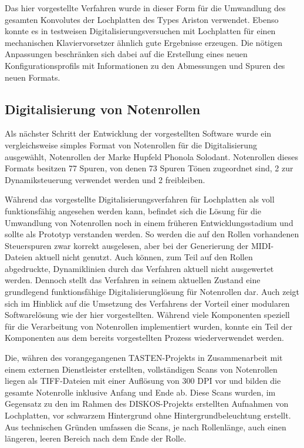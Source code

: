 Das hier vorgestellte Verfahren wurde in dieser Form für die Umwandlung des gesamten Konvolutes der Lochplatten des Types Ariston verwendet.
Ebenso konnte es in testweisen Digitalisierungsversuchen mit Lochplatten für einen mechanischen Klaviervorsetzer ähnlich gute Ergebnisse erzeugen.
Die nötigen Anpassungen beschränken sich dabei auf die Erstellung eines neuen Konfigurationsprofils mit Informationen zu den Abmessungen und Spuren des neuen Formats.

\subsection{Digitalisierung von Notenrollen}

Als nächster Schritt der Entwicklung der vorgestellten Software wurde ein vergleichsweise simples Format von Notenrollen für die Digitalisierung ausgewählt, Notenrollen der Marke Hupfeld Phonola Solodant.
Notenrollen dieses Formats besitzen 77 Spuren, von denen 73 Spuren Tönen zugeordnet sind, 2 zur Dynamiksteuerung verwendet werden und 2 freibleiben.

Während das vorgestellte Digitalisierungsverfahren für Lochplatten als voll funktionsfähig angesehen werden kann, befindet sich die Lösung für die Umwandlung von Notenrollen noch in einem früheren Entwicklungsstadium und sollte als Prototyp verstanden werden.
So werden die auf den Rollen vorhandenen Steuerspuren zwar korrekt ausgelesen, aber bei der Generierung der MIDI-Dateien aktuell nicht genutzt.
Auch können, zum Teil auf den Rollen abgedruckte, Dynamiklinien durch das Verfahren aktuell nicht ausgewertet werden.
Dennoch stellt das Verfahren in seinem aktuellen Zustand eine grundlegend funktionsfähige Digitalisierunglösung für Notenrollen dar.
Auch zeigt sich im Hinblick auf die Umsetzung des Verfahrens der Vorteil einer modularen Softwarelösung wie der hier vorgestellten.
Während viele Komponenten speziell für die Verarbeitung von Notenrollen implementiert wurden, konnte ein Teil der Komponenten aus dem bereits vorgestellten Prozess wiederverwendet werden.

Die, währen des vorangegangenen TASTEN-Projekts in Zusammenarbeit mit einem externen Dienstleister erstellten, vollständigen Scans von Notenrollen liegen als TIFF-Dateien mit einer Auflösung von 300 DPI vor und bilden die gesamte Notenrolle inklusive Anfang und Ende ab.
Diese Scans wurden, im Gegensatz zu den im Rahmen des DISKOS-Projekts erstellten Aufnahmen von Lochplatten, vor schwarzem Hintergrund ohne Hintergrundbeleuchtung erstellt.
Aus technischen Gründen umfassen die Scans, je nach Rollenlänge, auch einen längeren, leeren Bereich nach dem Ende der Rolle.

